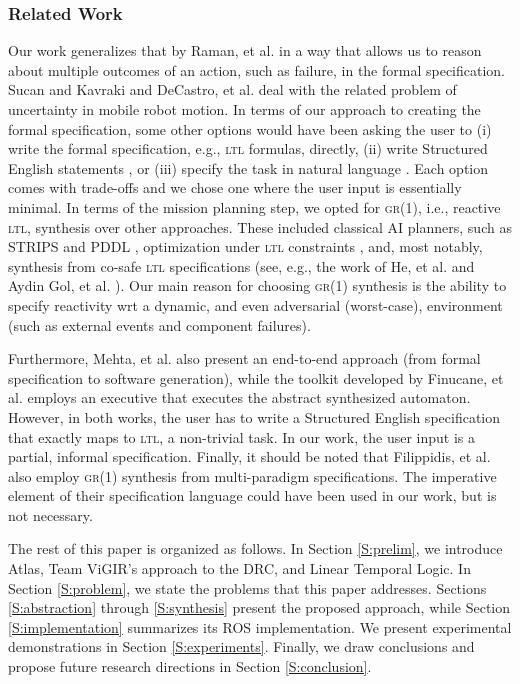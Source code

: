 \subsubsection*{Related Work}
Our work generalizes that by Raman, et al. \cite{Vasu2013ICRA} in a way that allows us to reason about multiple outcomes of an action, such as failure, in the formal specification.
Sucan and Kavraki \cite{Kavraki2012ICRA} and DeCastro, et al. \cite{Jon2015ICRA} deal with the related problem of uncertainty in mobile robot motion.
In terms of our approach to creating the formal specification, some other options would have been asking the user to (i) write the formal specification, e.g., \textsc{ltl} formulas, directly, (ii) write Structured English statements \cite{JFRKG2012ICRA}, or (iii) specify the task in natural language \cite{Lignos2015AURO}.
Each option comes with trade-offs and we chose one where the user input is essentially minimal.
In terms of the mission planning step, we opted for \textsc{gr(1)}, i.e., reactive \textsc{ltl}, synthesis \cite{Bloem2012GR1} over other approaches.
These included classical AI planners, such as STRIPS \cite{STRIPS1971AI} and PDDL \cite{PDDL1998TR}, optimization under \textsc{ltl} constraints \cite{Wolff2014ICRA}, and, most notably, synthesis from co-safe \textsc{ltl} specifications (see, e.g., the work of He, et al. \cite{Kavraki2015ICRA} and Aydin Gol, et al. \cite{Belta2014TAC}).
Our main reason for choosing \textsc{gr(1)} synthesis is the ability to specify reactivity \ac{wrt} a dynamic, and even adversarial (worst-case), environment (such as external events and component failures).

Furthermore, Mehta, et al.\cite{Ankur2015ISRR} also present an end-to-end approach (from formal specification to software generation), while the toolkit developed by Finucane, et al. \cite{Finucane2010IROS} employs an executive that executes the abstract synthesized automaton.
However, in both works, the user has to write a Structured English \cite{JFRKG2012ICRA} specification that exactly maps to \textsc{ltl}, a non-trivial task.
In our work, the user input is a partial, informal specification.
Finally, it should be noted that Filippidis, et al. \cite{Filippidis2015SYNT} also employ \textsc{gr(1)} synthesis from multi-paradigm specifications.
The imperative element of their specification language could have been used in our work, but is not necessary.

The rest of this paper is organized as follows.
In Section \ref{S:prelim}, we introduce Atlas, Team ViGIR's approach to the DRC, and Linear Temporal Logic.
In Section \ref{S:problem}, we state the problems that this paper addresses.
Sections \ref{S:abstraction} through \ref{S:synthesis} present the proposed approach, while Section \ref{S:implementation} summarizes its ROS implementation.
We present experimental demonstrations in Section \ref{S:experiments}.
Finally, we draw conclusions and propose future research directions in Section \ref{S:conclusion}.

